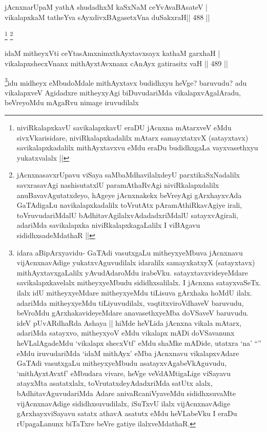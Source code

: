 \begin{shl}
jAcnxnarUpaM yathA shudadhxM kaSxNaM ceYvAvaBAsateV | \\
vikalapxkaM tatheYva sAyxdivxBAgasetxVna duSakxraH\hfill ||  488 ||  
\end{shl}

\begin{artha}
\footnote{niviRkalapxkavU savikalapxkavU eraDU jAcnxna mAtarxveV eMdu sivxVkarisidare, niviRkalapxkadalilx mAtarx samayxtatxvX (satayxtavx) savikalapxkadalilx mithAyxtavxvu eMdu eraDu budidhxgaLa vayxvasethxyu yukatxvalalx ||} \footnote{jAcnxnasavxrUpavu viSaya saMbaMdhavilalxdeyU parxtikaSxNadalilx savxrasavAgi nashisutatxlU paramAthaRvAgi niviRkalapxdalilx anuBavavAgutatxdeyo, hAgeye jAcnxnakekx beVreyAgi gArxhayxvAda GaTAdigaLu navikalapxkadalilx toVrutAtx pAramAthiRkavAgiye irali, toVruvudariMdalU bAdhitavAgilalxvAdadadxriMdalU satayxvAgirali, adariMda savikalapxka niviRkalapxkagaLalilx I viBAgavu sididhxsadeMdathaR ||}
\end{artha}

\begin{shl}
idaM mitheyxVti ceYtasAmxnimxthAyxtavxsayx kathaM garxhaH | \\
vikalapxshecxVnanx mithAyxtAvxnanx cAnAyx gatirasitx vaH \hfill||  489 ||  
\end{shl}

\begin{artha}
\footnote{idara aBipArxyavidu- GaTAdi vasutxgaLu mitheyxyeMbuva jAcnxnavu vijAcnxnavAdige yukatxvAguvudilalx idaralilx samayxkatxyX (satayxtavx) mithAyxtavxgaLalilx yAvudAdaroMdu irabeVku. satayxtavxvideyeMdare savikalapxkavelalx mitheyxyeMbudu sididhxsalilalx. I jAcnxna satayxvaSeTx. ilalx idU mitheyxyeMdare mitheyxyeMdu tiLisuva gArxhaka hoMdU ilalx. adariMda mitheyxyeMdu tiLiyuvudilalx, vaqtitxviroVdhaveV baruvudu, beVroMdu gArxhakavideyeMdare anavasethxyeMba doVSaveV baruvudu. ideV pUvARdhaRda Ashaya || hiMde heVLida jAcnxna vikala mAtarx, adariMda satayxvo, mitheyxyoV eMdu vikalapx mADi doVSavanunx heVLalAgadeMdu `vikalapx shecxVtf' eMdu shaMke mADide, utatxra `na' ``\stext'' eMdu iruvudariMda `idaM mithAyx' eMba jAcnxnavu vikalapxvAdare GaTAdi vasutxgaLu mitheyxyeMbudu asatayxvAgabeVkAguvudu, `mithAyxtAvxtf' eMbudara vivare, heVge veVdAMtigaLige viSayavu atayxMta asatatxlalx, toVrutatxdeyAdadxriMda satUtx alalx, bAdhitavAguvudariMda Adare anivaRcaniVyaveMdu sididhxsuvaMte vijAcnxnavAdige sididhxsuvudilalx, iSuTxvU ilalx vijAcnxnavAdige gArxhayxviSayavu satatx athavA asatutx eMdu heVLabeVku I eraDu rUpagaLanunx biTaTxre beVre gatiye ilalxveMdathaR.}idu midheyx eMbudoMdale mithAyxtavx budidhxyu heVge? baruvudu? adu vikalapxveV Agidadxre mitheyxyAgi biDuvudariMda vikalapxvAgalAradu, beVreyoMdu mAgaRvu nimage iruvudilalx
\end{artha}

